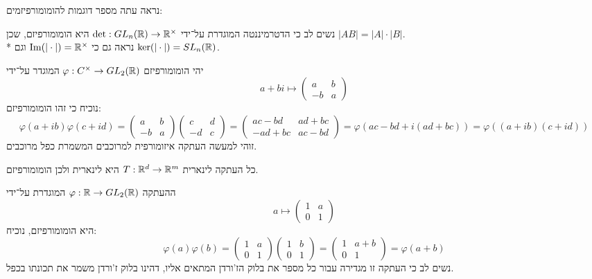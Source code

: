 נראה עתה מספר דוגמות להומומורפיזמים:
\begin{example}[דטרמיננטה]
	נשים לב כי הדטרמיננטה המוגדרת על־ידי $\det : GL_n(\mathbb{R}) \to \mathbb{R}^\times$ היא הומומורפיזם, שכן $|AB| = |A| \cdot |B|$. \\*
	נראה גם כי $\operatorname{Im}(|\cdot|) = \mathbb{R}^\times$ וגם $\ker(| \cdot|) = SL_n(\mathbb{R})$.
\end{example}
\begin{example}
	יהי הומומורפיזם $\varphi : C^\times \to GL_2(\mathbb{R})$ המוגדר על־ידי 
	\[
		a + bi \mapsto
		\begin{pmatrix}
			a & b \\
			-b & a
		\end{pmatrix}
	\]
	נוכיח כי זהו הומומורפיזם:
	\[
		\varphi(a + ib)\varphi(c + id) = 
		\begin{pmatrix}
			a & b \\
			-b & a
		\end{pmatrix}
		\begin{pmatrix}
			c & d \\
			-d & c
		\end{pmatrix}
		=
		\begin{pmatrix}
			ac - bd & ad + bc \\
			-ad + bc & ac - bd
		\end{pmatrix}
		= \varphi(ac - bd + i(ad + bc))
		= \varphi((a + ib)(c + id))
	\]
	זוהי למעשה העתקה איזומורפית למרוכבים המשמרת כפל מרוכבים.
\end{example}
\begin{example}
	כל העתקה לינארית $T : \mathbb{R}^d \to \mathbb{R}^m$ היא לינארית ולכן הומומורפיזם.
\end{example}
\begin{example}
	ההעתקה $\varphi : \mathbb{R} \to GL_2(\mathbb{R})$ המוגדרת על־ידי
	\[
		a \mapsto \begin{pmatrix}
			1 & a \\
			0 & 1
		\end{pmatrix}
	\]
	היא הומומורפיזם, נוכיח:
	\[
		\varphi(a)\varphi(b)
		=
		\begin{pmatrix}
			1 & a \\
			0 & 1
		\end{pmatrix}
		\begin{pmatrix}
			1 & b \\
			0 & 1
		\end{pmatrix}
		=
		\begin{pmatrix}
			1 & a + b \\
			0 & 1
		\end{pmatrix}
		= \varphi(a + b)
	\]
	נשים לב כי העתקה זו מגדירה עבור כל מספר את בלוק הז'ורדן המתאים אליו, דהינו בלוק ז'ורדן משמר את תכונתו בכפל.
\end{example}
